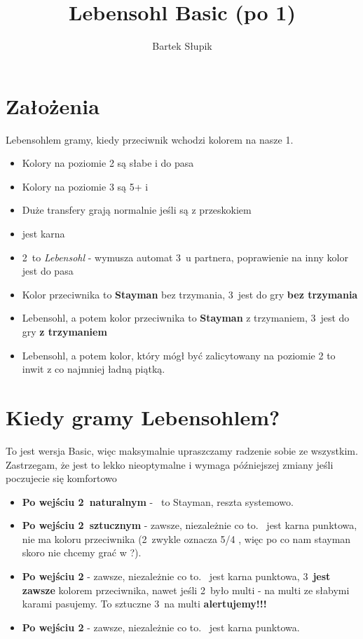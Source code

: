 \documentclass[12pt, a4paper]{article}
\title{Lebensohl Basic (po 1\nt)}
\author{Bartek Słupik}
\begin{document}
    \section{Założenia}
    Lebensohlem gramy, kiedy przeciwnik wchodzi kolorem na nasze 1\nt.
    \begin{itemize}
        \item Kolory na poziomie 2 są słabe i do pasa
        \item Kolory na poziomie 3 są 5+ i \gf
        \item Duże transfery grają normalnie jeśli są z przeskokiem \br
        \item \dbl jest karna
        \item 2\nt\ to \emph{Lebensohl} - wymusza automat 3\clubs\ u partnera,
        poprawienie na inny kolor jest do pasa \br
        \item Kolor przeciwnika to \textbf{Stayman} bez trzymania, 3\nt\ jest do gry \textbf{bez trzymania}
        \item Lebensohl, a potem kolor przeciwnika to \textbf{Stayman} z trzymaniem, 3\nt\ jest do gry \textbf{z trzymaniem}
        \item Lebensohl, a potem kolor, który mógł być zalicytowany na poziomie 2 to inwit z co najmniej ładną piątką.
    \end{itemize}

    \section{Kiedy gramy Lebensohlem?}
    To jest wersja Basic, więc maksymalnie upraszczamy radzenie sobie ze wszystkim.
    Zastrzegam, że jest to lekko nieoptymalne i wymaga późniejszej zmiany jeśli poczujecie się komfortowo
    \begin{itemize}
        \item \textbf{Po wejściu 2\clubs\ naturalnym} - \dbl\ to Stayman, reszta systemowo. 
        \item \textbf{Po wejściu 2\clubs\ sztucznym} - zawsze, niezależnie co to. \dbl\ jest karna punktowa, nie ma koloru przeciwnika 
        (2\clubs\ zwykle oznacza 5/4 \major, więc po co nam stayman skoro nie chcemy grać w \major?).
        \item \textbf{Po wejściu 2\diams} - zawsze, niezależnie co to. \dbl\ jest karna punktowa, 3\diams\
        \textbf{jest zawsze} kolorem przeciwnika, nawet jeśli 2\diams\ było multi - na multi ze słabymi karami pasujemy.
        To sztuczne 3\diams\ na multi \textbf{alertujemy!!!}
        \item \textbf{Po wejściu 2\major} - zawsze, niezależnie co to. \dbl\ jest karna punktowa.
    \end{itemize}
\end{document}
